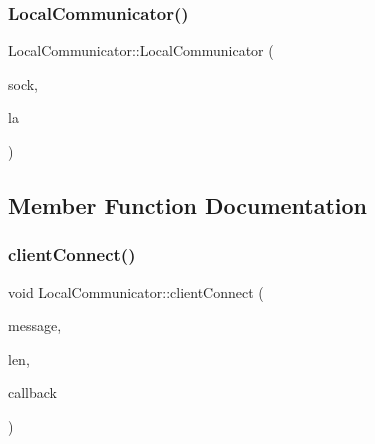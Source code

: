 \mbox{\label{classLocalCommunicator_a22dbee26502e3ac2bdf46b9f094d881d}} 
\subsubsection{\texorpdfstring{Local\+Communicator()}{LocalCommunicator()}\hspace{0.1cm}{\footnotesize\ttfamily [3/3]}}
{\footnotesize\ttfamily Local\+Communicator\+::\+Local\+Communicator (\begin{DoxyParamCaption}\item[{\hyperlink{structcubiumServerSocket__t}{cubium\+Server\+Socket\+\_\+t} $\ast$}]{sock,  }\item[{\hyperlink{structLogicalAddress}{Logical\+Address}}]{la }\end{DoxyParamCaption})\hspace{0.3cm}{\ttfamily [inline]}}



\subsection{Member Function Documentation}
\mbox{\label{classLocalCommunicator_a4dc9ea76a7d6d1d363ec8b69c1d5d586}} 
\subsubsection{\texorpdfstring{client\+Connect()}{clientConnect()}}
{\footnotesize\ttfamily void Local\+Communicator\+::client\+Connect (\begin{DoxyParamCaption}\item[{\hyperlink{structSpaMessage}{Spa\+Message} $\ast$}]{message,  }\item[{size\+\_\+t}]{len,  }\item[{std\+::function$<$ void(\hyperlink{structcubiumClientSocket__t}{cubium\+Client\+Socket\+\_\+t} $\ast$)$>$}]{callback }\end{DoxyParamCaption})}

\mbox{\label{classLocalCommunicator_a03deedab1d3f79fe328a21aa2d5c6bfb}} 
